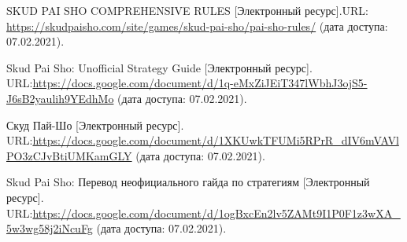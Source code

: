 \documentclass[a4paper,12pt]{diplom}
\begin{document}
\renewcommand{\bibname}{Список литературы} 

\begin{thebibliography}{4}

	SKUD PAI SHO COMPREHENSIVE RULES [Электронный ресурс].URL: \url{https://skudpaisho.com/site/games/skud-pai-sho/pai-sho-rules/}
	(дата доступа: 07.02.2021).

	Skud Pai Sho: Unofficial Strategy Guide [Электронный ресурс]. URL:\url{https://docs.google.com/document/d/1q-eMxZiJEiT347lWbhJ3ojS5-J6sB2yaulih9YEdhMo}
	(дата доступа: 07.02.2021).

	Скуд Пай-Шо [Электронный ресурс]. URL:\url{https://docs.google.com/document/d/1XKUwkTFUMi5RPrR_dIV6mVAVlPO3zCJvBtiUMKamGLY}
	(дата доступа: 07.02.2021).

	Skud Pai Sho: Перевод неофициального гайда по стратегиям [Электронный ресурс]. URL:\url{https://docs.google.com/document/d/1ogBxcEn2lv5ZAMt9I1P0F1z3wXA_5w3wg58j2iNcuFg}
	(дата доступа: 07.02.2021).

\end{thebibliography}
\end{document}
